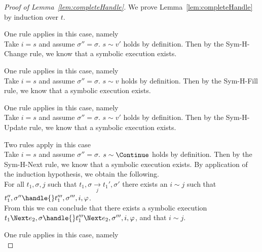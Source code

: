 \begin{proof}[Proof of Lemma~\ref{lem:completeHandle}]

  We prove Lemma~\ref{lem:completeHandle} by induction over $t$.\\

  {One rule applies in this case, namely \\
  Take $i=s$ and assume $\sigma''=\sigma$. $s\sim v'$ holds by definition.
  Then by the Sym-H-Change rule, we know that a symbolic execution exists.

  }

  {One rule applies in this case, namely \\
  Take $i=s$ and assume $\sigma''=\sigma$. $s\sim v$ holds by definition.
  Then by the Sym-H-Fill rule,
  we know that a symbolic execution exists.
  }

  {One rule applies in this case, namely \\
  Take $i=s$ and assume $\sigma''=\sigma$. $s\sim v'$ holds by definition.
  Then by the Sym-H-Update rule,
  we know that a symbolic execution exists.
   }

  {Two rules apply in this case\\
    {
    Take $i=s$ and assume $\sigma''=\sigma$. $s\sim \Continue$ holds by definition.
    Then by the Sym-H-Next rule, we know that a symbolic execution exists.
    }
    {
    By application of the induction hypothesis, we obtain the following.\\
    For all $t_1,\sigma,j$ such that $t_1,\sigma\xrightarrow[j]{}t_1',\sigma'$ there exists an $i\sim j$ such that $t_1'',\sigma''\handle{}t_1''',\sigma''',i,\phi$.\\
    From this we can conclude that there exists a symbolic execution $t_1\Next e_2,\sigma\handle{} t_1'''\Next e_2,\sigma''',i,\phi$, and that $i\sim j$.
    }
  }


  {
  One rule applies in this case, namely \\

}
\end{proof}
